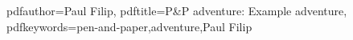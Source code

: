 \newcommand{\adventurename}{Example adventure}

\newcommand{\adventureauthor}{Paul Filip}
\newcommand{\typesetter}{Prof. Dr. Guido Drexlin}
\hypersetup
{
	pdfauthor={\adventureauthor},
	pdftitle={P\&P adventure: \adventurename},
	pdfkeywords={pen-and-paper,adventure,\adventureauthor}
}
